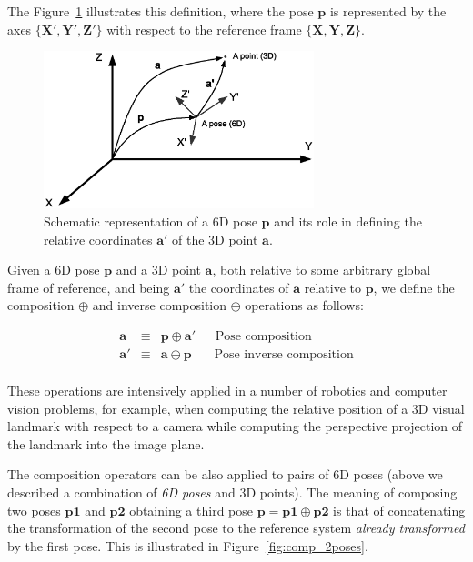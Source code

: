 \documentclass[a4paper,10pt]{report}
\begin{document}
The Figure~\ref{fig:1} illustrates this definition, where the pose $\mathbf{p}$ is represented
by the axes $\{\mathbf{X}',\mathbf{Y}',\mathbf{Z}' \}$ with respect to the reference frame 
$\{\mathbf{X},\mathbf{Y},\mathbf{Z} \}$.


\begin{figure}[h!]
\centering
\includegraphics[width=0.70\textwidth]{fig_pose_composition.eps}
\caption{Schematic representation of a 6D pose $\mathbf{p}$ and its role in defining 
the relative coordinates $\mathbf{a}'$ of the 3D point $\mathbf{a}$.}
\label{fig:1}
\end{figure}


Given a 6D pose $\mathbf{p}$ and a 3D point $\mathbf{a}$, both relative to some arbitrary
global frame of reference, and being $\mathbf{a}'$ the coordinates of $\mathbf{a}$ relative
to $\mathbf{p}$, we define 
the composition $\oplus$ and inverse composition $\ominus$ operations as follows:

\begin{eqnarray*}
\mathbf{a} & \equiv & \mathbf{p} \oplus \mathbf{a}'   ~~~~~~~ \textrm{Pose composition} \\
\mathbf{a'} & \equiv & \mathbf{a} \ominus \mathbf{p}  ~~~~~~~~ \textrm{Pose inverse composition} \\
\end{eqnarray*}

These operations are intensively applied in a number of robotics and computer vision 
problems, for example, when computing the relative position of a 3D visual landmark 
with respect to a camera while computing the perspective projection of the landmark 
into the image plane.

The composition operators can be also applied to pairs of 6D poses (above we described a combination
of \emph{6D poses} and {3D points}). 
The meaning of composing two poses $\mathbf{p1}$ and $\mathbf{p2}$ 
obtaining a third pose $\mathbf{p} = \mathbf{p1} \oplus \mathbf{p2}$ 
is that of concatenating the transformation of the second pose to the reference system
\emph{already transformed} by the first pose. 
This is illustrated in Figure~\ref{fig:comp_2poses}. 
\end{document}
